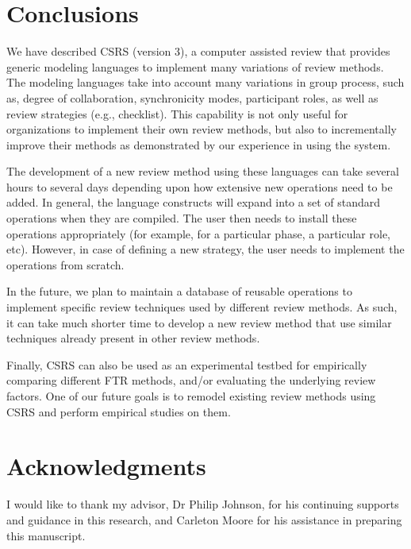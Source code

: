 \section{Conclusions}

We have described CSRS (version 3), a computer assisted review that
provides generic modeling languages to implement many variations of
review methods. The modeling languages take into account many
variations in group process, such as, degree of collaboration,
synchronicity modes, 
participant roles, as well as review strategies (e.g., checklist). 
This capability is not only useful for organizations
to implement their own review methods, but also to incrementally
improve their methods as demonstrated by our experience in using the
system. 

The development of a new review method using these languages 
can take several hours to several days depending upon how extensive
new operations need to be added. In general, the language constructs
will expand into a set 
of standard operations when they are compiled. The user
then needs to install these operations appropriately (for example, for
a particular phase, a particular role, etc). However, in case
of defining a new strategy, the user needs to implement the
operations from scratch.

In the future, we plan to maintain a database of reusable operations
to implement specific review techniques used by different review
methods. As such, it can take much shorter 
time to develop a new review method that use similar techniques
already present in other review methods.

Finally, CSRS can also be used as an experimental testbed for
empirically comparing different FTR methods, and/or evaluating the
underlying review factors. One of our future goals is to remodel
existing review methods using CSRS and perform empirical studies on
them. 


\section{Acknowledgments}

I would like to thank my advisor, Dr Philip Johnson, for his
continuing supports and guidance in this research,
and Carleton Moore for his assistance in preparing this manuscript.





